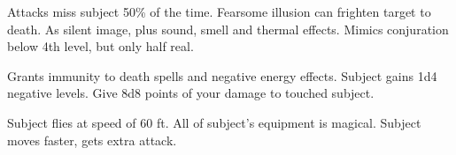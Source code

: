 \begin{swspelllist}
   Attacks miss subject 50\% of the time.
   Fearsome illusion can frighten target to death.
   As silent image, plus sound, smell and thermal effects.
   Mimics conjuration below 4th level, but only half real.

   Grants immunity to death spells and negative energy effects.
   Subject gains 1d4 negative levels.
   Give 8d8 points of your damage to touched subject.
  \spellheadrestricted{}

   Subject flies at speed of 60 ft.
   All of subject's equipment is magical.
   Subject moves faster, gets extra attack.
\end{swspelllist}

